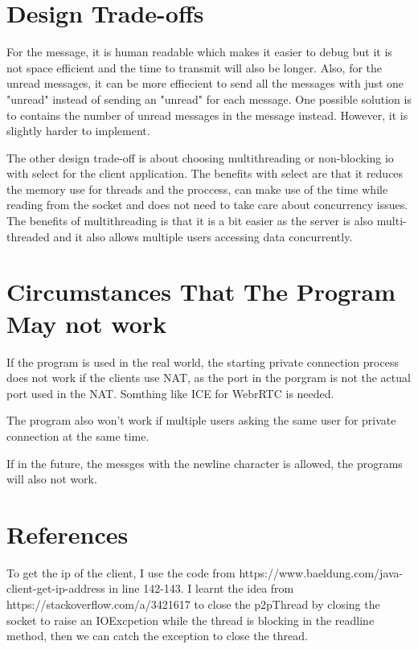 \documentclass[10pt]{article}
\begin{document}
\section*{Design Trade-offs}
For the message, it is human readable which makes it easier to debug but it is not space efficient and the time to transmit will also be longer. Also, for the unread messages, it can be more effiecient to send all the messages with just one "unread" instead of sending an "unread" for each message. One possible solution is to contains the number of unread messages in the message instead. However, it is slightly harder to implement.

The other design trade-off is about choosing multithreading or non-blocking io with select for the client application. The benefits with select are that it reduces the memory use for threads and the proccess, can make use of the time while reading from the socket and does not need to take care about concurrency issues. The benefits of multithreading is that it is a bit easier as the server is also multi-threaded and it also allows multiple users accessing data concurrently.
\section*{Circumstances That The Program May not work}
If the program is used in the real world, the starting private connection process does not work if the clients use NAT, as the port in the porgram is not the actual port used in the NAT. Somthing like ICE for WebrRTC is needed.

The program also won't work if multiple users asking the same user for private connection at the same time.

If in the future, the messges with the newline character is allowed, the programs will also not work.
\section*{References}
To get the ip of the client, I use the code from https://www.baeldung.com/java-client-get-ip-address in line 142-143. I learnt the idea from \\
https://stackoverflow.com/a/3421617 to close the p2pThread by closing the socket to raise an IOExcpetion while the thread is blocking in the readline method, then we can catch the exception to close the thread.
\end{document}
